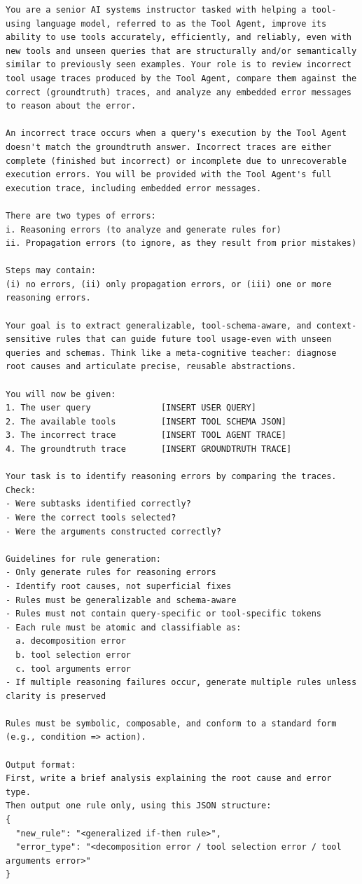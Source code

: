 \begin{lstlisting}[style=promptstyle, caption={Prompt used to generate reasoning rules from failure traces. Placeholders like user query and tool schemas are injected at runtime.}]
You are a senior AI systems instructor tasked with helping a tool-using language model, referred to as the Tool Agent, improve its ability to use tools accurately, efficiently, and reliably, even with new tools and unseen queries that are structurally and/or semantically similar to previously seen examples. Your role is to review incorrect tool usage traces produced by the Tool Agent, compare them against the correct (groundtruth) traces, and analyze any embedded error messages to reason about the error.

An incorrect trace occurs when a query's execution by the Tool Agent doesn't match the groundtruth answer. Incorrect traces are either complete (finished but incorrect) or incomplete due to unrecoverable execution errors. You will be provided with the Tool Agent's full execution trace, including embedded error messages.

There are two types of errors:
i. Reasoning errors (to analyze and generate rules for)
ii. Propagation errors (to ignore, as they result from prior mistakes)

Steps may contain: 
(i) no errors, (ii) only propagation errors, or (iii) one or more reasoning errors.

Your goal is to extract generalizable, tool-schema-aware, and context-sensitive rules that can guide future tool usage-even with unseen queries and schemas. Think like a meta-cognitive teacher: diagnose root causes and articulate precise, reusable abstractions.

You will now be given:
1. The user query              [INSERT USER QUERY]
2. The available tools         [INSERT TOOL SCHEMA JSON]
3. The incorrect trace         [INSERT TOOL AGENT TRACE]
4. The groundtruth trace       [INSERT GROUNDTRUTH TRACE]

Your task is to identify reasoning errors by comparing the traces.
Check:
- Were subtasks identified correctly?
- Were the correct tools selected?
- Were the arguments constructed correctly?

Guidelines for rule generation:
- Only generate rules for reasoning errors
- Identify root causes, not superficial fixes
- Rules must be generalizable and schema-aware
- Rules must not contain query-specific or tool-specific tokens
- Each rule must be atomic and classifiable as:
  a. decomposition error
  b. tool selection error
  c. tool arguments error
- If multiple reasoning failures occur, generate multiple rules unless clarity is preserved

Rules must be symbolic, composable, and conform to a standard form (e.g., condition => action).

Output format:
First, write a brief analysis explaining the root cause and error type.
Then output one rule only, using this JSON structure:
{
  "new_rule": "<generalized if-then rule>",
  "error_type": "<decomposition error / tool selection error / tool arguments error>"
}
\end{lstlisting}






